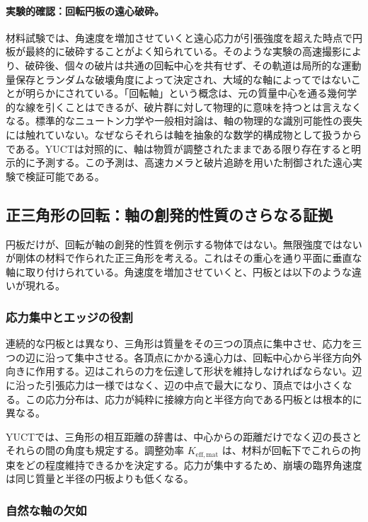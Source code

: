\documentclass[12pt,a4paper]{article}
\begin{document}
	\paragraph{実験的確認：回転円板の遠心破砕。}
	材料試験では、角速度を増加させていくと遠心応力が引張強度を超えた時点で円板が最終的に破砕することがよく知られている。そのような実験の高速撮影により、破砕後、個々の破片は共通の回転中心を共有せず、その軌道は局所的な運動量保存とランダムな破壊角度によって決定され、大域的な軸によってではないことが明らかにされている。「回転軸」という概念は、元の質量中心を通る幾何学的な線を引くことはできるが、破片群に対して物理的に意味を持つとは言えなくなる。標準的なニュートン力学や一般相対論は、軸の物理的な識別可能性の喪失には触れていない。なぜならそれらは軸を抽象的な数学的構成物として扱うからである。YUCTは対照的に、軸は物質が調整されたままである限り存在すると明示的に予測する。この予測は、高速カメラと破片追跡を用いた制御された遠心実験で検証可能である。
	
	\subsection{正三角形の回転：軸の創発的性質のさらなる証拠}
	
	円板だけが、回転が軸の創発的性質を例示する物体ではない。無限強度ではないが剛体の材料で作られた正三角形を考える。これはその重心を通り平面に垂直な軸に取り付けられている。角速度を増加させていくと、円板とは以下のような違いが現れる。
	
	\subsubsection{応力集中とエッジの役割}
	
	連続的な円板とは異なり、三角形は質量をその三つの頂点に集中させ、応力を三つの辺に沿って集中させる。各頂点にかかる遠心力は、回転中心から半径方向外向きに作用する。辺はこれらの力を伝達して形状を維持しなければならない。辺に沿った引張応力は一様ではなく、辺の中点で最大になり、頂点では小さくなる。この応力分布は、応力が純粋に接線方向と半径方向である円板とは根本的に異なる。
	
	YUCTでは、三角形の相互距離の辞書は、中心からの距離だけでなく辺の長さとそれらの間の角度も規定する。調整効率 \(K_{\mathrm{eff,mat}}\) は、材料が回転下でこれらの拘束をどの程度維持できるかを決定する。応力が集中するため、崩壊の臨界角速度は同じ質量と半径の円板よりも低くなる。
	
	\subsubsection{自然な軸の欠如}
	
\end{document}
